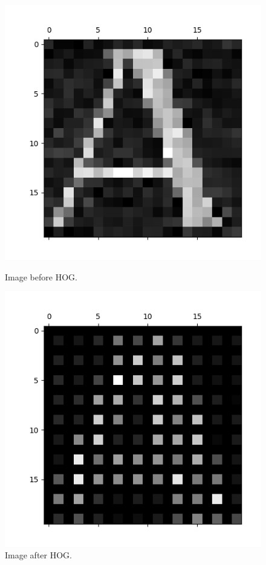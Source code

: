 \begin{figure}[H] 
  \centering
  \begin{minipage}[b]{0.22\textwidth}
    \includegraphics[width=\textwidth]{pictures/A_normalpng.png}
    \caption{Image before HOG.}
    \label{fig:noHOG}
  \end{minipage}
  \hfill
  \begin{minipage}[b]{0.22\textwidth}
    \includegraphics[width=\textwidth]{pictures/A_HOG.png}
    \caption{Image after HOG.}
    \label{fig:HOG}
  \end{minipage}
\end{figure}




